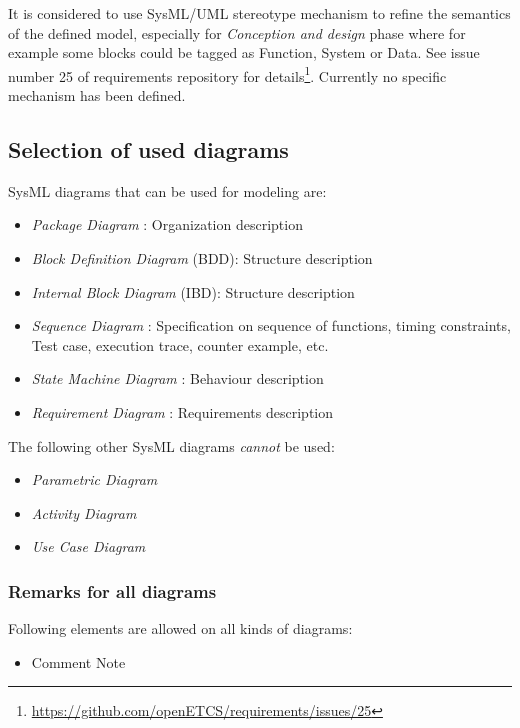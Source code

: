 It is considered to use SysML/UML stereotype mechanism to refine the
semantics of the defined model, especially for \emph{Conception and
  design} phase where for example some blocks could be tagged as
Function, System or Data. See issue number 25 of requirements
repository for
details\footnote{\url{https://github.com/openETCS/requirements/issues/25}}.
Currently no specific mechanism has been defined.

\subsection{Selection of used diagrams}

SysML diagrams that can be used for modeling are:
\begin{itemize}
\item \emph{Package Diagram}   : Organization description
\item \emph{Block Definition Diagram}  (BDD): Structure description
\item \emph{Internal Block Diagram}  (IBD): Structure description
\item \emph{Sequence Diagram}  : Specification on sequence of functions, timing constraints, Test case, execution trace, counter
  example, etc.
\item \emph{State Machine Diagram}  : Behaviour description
\item \emph{Requirement Diagram}  : Requirements description
\end{itemize}

The following other SysML diagrams \emph{cannot} be used:
\begin{itemize}
\item \emph{Parametric Diagram}
\item \emph{Activity Diagram}
\item \emph{Use Case Diagram}
\end{itemize}

\subsubsection{Remarks for all diagrams}

Following elements are allowed on all kinds of diagrams:
\begin{itemize}
\item Comment Note
\end{itemize}

